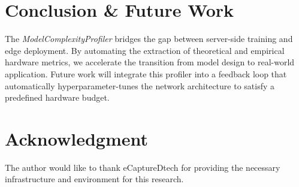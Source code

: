 \documentclass[conference]{IEEEtran}
\begin{document}
\section{Conclusion \& Future Work}
The \textit{ModelComplexityProfiler} bridges the gap between server-side training and edge deployment. By automating the extraction of theoretical and empirical hardware metrics, we accelerate the transition from model design to real-world application. Future work will integrate this profiler into a feedback loop that automatically hyperparameter-tunes the network architecture to satisfy a predefined hardware budget.

\section*{Acknowledgment}
The author would like to thank eCaptureDtech for providing the necessary infrastructure and environment for this research.



\end{document}

